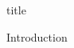 \documentclass{article}
\begin{document}
{title}

\frontmatter

\tableofcontents

\listoffigures
\listoftables

\mainmatter


{Introduction}

\newpage
\printbibliography[heading = bibintoc]    %

\end{document}
